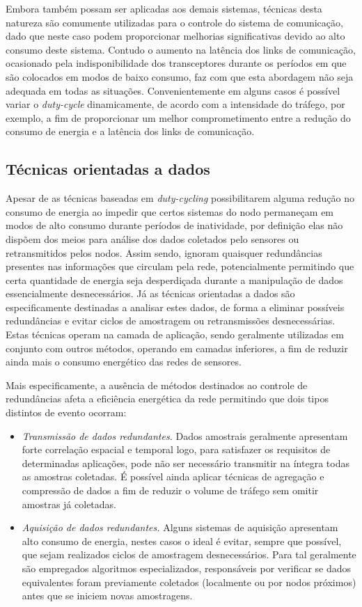 \documentclass[
	12pt,				%
	openright,			%
	oneside,
	a4paper,			%
	english,			%
	french,				%
	spanish,			%
	brazil				%
	]{abntex2}
\begin{document}
Embora também possam ser aplicadas aos demais sistemas, técnicas desta natureza são comumente utilizadas para o controle do sistema de comunicação, dado que neste caso podem proporcionar melhorias significativas devido ao alto consumo deste sistema. Contudo o aumento na latência dos links de comunicação, ocasionado pela indisponibilidade dos transceptores durante os períodos em que são colocados em modos de baixo consumo, faz com que esta abordagem não seja adequada em todas as situações. Convenientemente em alguns casos é possível variar o \textit{duty-cycle} dinamicamente, de acordo com a intensidade do tráfego, por exemplo, a fim de proporcionar um melhor comprometimento entre a redução do consumo de energia e a latência dos links de comunicação.

\subsection{Técnicas orientadas a dados}

Apesar de as técnicas baseadas em \textit{duty-cycling} possibilitarem alguma redução no consumo de energia ao impedir que certos sistemas do nodo permaneçam em modos de alto consumo durante períodos de inatividade, por definição elas não dispõem dos meios para análise dos dados coletados pelo sensores ou retransmitidos pelos nodos. Assim sendo, ignoram quaisquer redundâncias presentes nas informações que circulam pela rede, potencialmente permitindo que certa quantidade de energia seja desperdiçada durante a manipulação de dados essencialmente desnecessários. Já as técnicas orientadas a dados são especificamente destinadas a analisar estes dados, de forma a eliminar possíveis redundâncias e evitar ciclos de amostragem ou retransmissões desnecessárias. Estas técnicas operam na camada de aplicação, sendo geralmente utilizadas em conjunto com outros métodos, operando em camadas inferiores, a fim de reduzir ainda mais o consumo energético das redes de sensores.

Mais especificamente, a ausência de métodos destinados ao controle de redundâncias afeta a eficiência energética da rede permitindo que dois tipos distintos de evento ocorram:

\begin{itemize}
	\item \textit{Transmissão de dados redundantes.} Dados amostrais geralmente apresentam forte correlação espacial e temporal logo, para satisfazer os requisitos de determinadas aplicações, pode não ser necessário transmitir na íntegra todas as amostras coletadas. É possível ainda aplicar técnicas de agregação e compressão de dados a fim de reduzir o volume de tráfego sem omitir amostras já coletadas.
	\item \textit{Aquisição de dados redundantes.} Alguns sistemas de aquisição apresentam alto consumo de energia, nestes casos o ideal é evitar, sempre que possível, que sejam realizados ciclos de amostragem desnecessários. Para tal geralmente são empregados algoritmos especializados, responsáveis por verificar se dados equivalentes foram previamente coletados (localmente ou por nodos próximos) antes que se iniciem novas amostragens.
\end{itemize}
\end{document}
